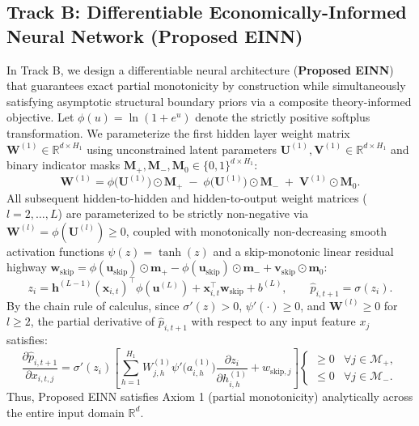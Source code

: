 \documentclass[11pt,a4paper]{article}
\begin{document}
\subsection{Track B: Differentiable Economically-Informed Neural Network (Proposed EINN)}
In Track B, we design a differentiable neural architecture (\textbf{Proposed EINN}) that guarantees exact partial monotonicity by construction while simultaneously satisfying asymptotic structural boundary priors via a composite theory-informed objective. Let $\phi(u) = \ln(1 + e^u)$ denote the strictly positive softplus transformation. We parameterize the first hidden layer weight matrix $\mathbf{W}^{(1)} \in \mathbb{R}^{d \times H_1}$ using unconstrained latent parameters $\mathbf{U}^{(1)}, \mathbf{V}^{(1)} \in \mathbb{R}^{d \times H_1}$ and binary indicator masks $\mathbf{M}_+, \mathbf{M}_-, \mathbf{M}_0 \in \{0,1\}^{d \times H_1}$:
\begin{equation}
    \mathbf{W}^{(1)} = \phi\big(\mathbf{U}^{(1)}\big) \odot \mathbf{M}_+ \;-\; \phi\big(\mathbf{U}^{(1)}\big) \odot \mathbf{M}_- \;+\; \mathbf{V}^{(1)} \odot \mathbf{M}_0.
    \label{eq:einn_w1}
\end{equation}
All subsequent hidden-to-hidden and hidden-to-output weight matrices ($l = 2,\dots,L$) are parameterized to be strictly non-negative via $\mathbf{W}^{(l)} = \phi(\mathbf{U}^{(l)}) \ge 0$, coupled with monotonically non-decreasing smooth activation functions $\psi(z) = \tanh(z)$ and a skip-monotonic linear residual highway $\mathbf{w}_{\text{skip}} = \phi(\mathbf{u}_{\text{skip}}) \odot \mathbf{m}_+ - \phi(\mathbf{u}_{\text{skip}}) \odot \mathbf{m}_- + \mathbf{v}_{\text{skip}} \odot \mathbf{m}_0$:
\begin{equation}
    z_i = \mathbf{h}^{(L-1)}(\mathbf{x}_{i,t})^\top \phi(\mathbf{u}^{(L)}) + \mathbf{x}_{i,t}^\top \mathbf{w}_{\text{skip}} + b^{(L)}, \qquad \hat{p}_{i,t+1} = \sigma(z_i).
\end{equation}
By the chain rule of calculus, since $\sigma'(z) > 0$, $\psi'(\cdot) \ge 0$, and $\mathbf{W}^{(l)} \ge 0$ for $l \ge 2$, the partial derivative of $\hat{p}_{i,t+1}$ with respect to any input feature $x_j$ satisfies:
\begin{equation}
    \frac{\partial \hat{p}_{i,t+1}}{\partial x_{i,t,j}} = \sigma'(z_i)\left[ \sum_{h=1}^{H_1} W_{j,h}^{(1)} \psi'\big(a_{i,h}^{(1)}\big) \frac{\partial z_i}{\partial h_{i,h}^{(1)}} + w_{\text{skip},j} \right] \begin{cases}
        \ge 0 & \forall j \in \mathcal{M}_+, \\
        \le 0 & \forall j \in \mathcal{M}_-.
    \end{cases}
\end{equation}
Thus, Proposed EINN satisfies Axiom 1 (partial monotonicity) analytically across the entire input domain $\mathbb{R}^d$.
\end{document}
